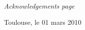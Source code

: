 \thispagestyle{plain}
\Huge{\emph{Acknowledgements page}}
\vspace{1cm}
\normalsize{}

\lipsum[1]
\lipsum[2]
\lipsum[3]

\vspace{1cm}
\small{\hfill Toulouse, le 01 mars 2010}